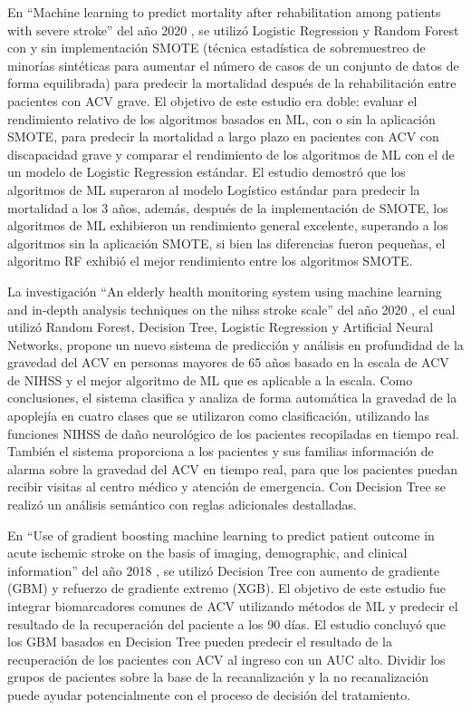 \par En “Machine learning to predict mortality after rehabilitation among patients with severe stroke” del año 2020 \cite{Scrutinio2020}, se utilizó Logistic Regression y Random Forest con y sin implementación SMOTE (técnica estadística de sobremuestreo de minorías sintéticas para aumentar el número de casos de un conjunto de datos de forma equilibrada) para predecir la mortalidad después de la rehabilitación entre pacientes con ACV grave. El objetivo de este estudio era doble: evaluar el rendimiento relativo de los algoritmos basados en ML, con o sin la aplicación SMOTE, para predecir la mortalidad a largo plazo en pacientes con ACV con discapacidad grave y comparar el rendimiento de los algoritmos de ML con el de un modelo de Logistic Regression estándar. El estudio demostró que los algoritmos de ML superaron al modelo Logístico estándar para predecir la mortalidad a los 3 años, además, después de la implementación de SMOTE, los algoritmos de ML exhibieron un rendimiento general excelente, superando a los algoritmos sin la aplicación SMOTE, si bien las diferencias fueron pequeñas, el algoritmo RF exhibió el mejor rendimiento entre los algoritmos SMOTE.\\

\par La investigación “An elderly health monitoring system using machine learning and in-depth analysis techniques on the nihss stroke scale” del año 2020 \cite{Yu2020}, el cual utilizó Random Forest, Decision Tree, Logistic Regression y Artificial Neural Networks, propone un nuevo sistema de predicción y análisis en profundidad de la gravedad del ACV en personas mayores de 65 años basado en la escala de ACV de NIHSS y el mejor algoritmo de ML que es aplicable a la escala. Como conclusiones, el sistema clasifica y analiza de forma automática la gravedad de la apoplejía en cuatro clases que se utilizaron como clasificación, utilizando las funciones NIHSS de daño neurológico de los pacientes recopiladas en tiempo real. También el sistema proporciona a los pacientes y sus familias información de alarma sobre la gravedad del ACV en tiempo real, para que los pacientes puedan recibir visitas al centro médico y atención de emergencia. Con Decision Tree se realizó un análisis semántico con reglas adicionales destalladas.\\

\par En “Use of gradient boosting machine learning to predict patient outcome in acute ischemic stroke on the basis of imaging, demographic, and clinical information” del año 2018 \cite{Xie2018}, se utilizó Decision Tree con aumento de gradiente (GBM) y refuerzo de gradiente extremo (XGB). El objetivo de este estudio fue integrar biomarcadores comunes de ACV utilizando métodos de ML y predecir el resultado de la recuperación del paciente a los 90 días. El estudio concluyó que los GBM basados en Decision Tree pueden predecir el resultado de la recuperación de los pacientes con ACV al ingreso con un AUC alto. Dividir los grupos de pacientes sobre la base de la recanalización y la no recanalización puede ayudar potencialmente con el proceso de decisión del tratamiento.\\

